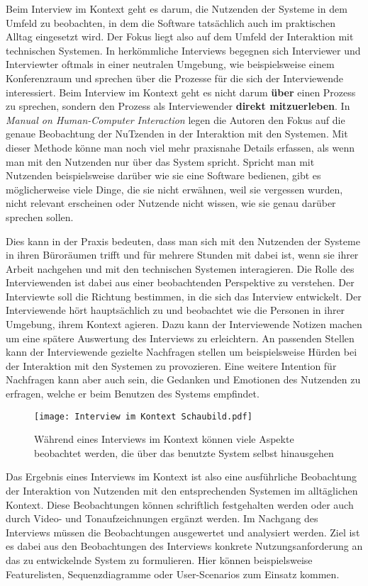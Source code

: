 Beim Interview im Kontext geht es darum, die Nutzenden der Systeme in dem
Umfeld zu beobachten, in dem die Software tatsächlich auch im praktischen
Alltag eingesetzt wird. Der Fokus liegt also auf dem Umfeld der Interaktion mit
technischen Systemen. In herkömmliche Interviews begegnen sich Interviewer und
Interviewter oftmals in einer neutralen Umgebung, wie beispielsweise einem
Konferenzraum und sprechen über die Prozesse für die sich der Interviewende
interessiert. Beim Interview im Kontext geht es nicht darum \textbf{über} einen
Prozess zu sprechen, sondern den Prozess als Interviewender \textbf{direkt
    mitzuerleben}\cite{contextualDesign}. In \textit{Manual on Human-Computer
    Interaction} legen die Autoren den Fokus auf die genaue Beobachtung der
NuTzenden in der Interaktion mit den Systemen. Mit dieser Methode könne man
noch viel mehr praxisnahe Details erfassen, als wenn man mit den Nutzenden nur
über das System spricht. Spricht man mit Nutzenden beispielsweise darüber wie
sie eine Software bedienen, gibt es möglicherweise viele Dinge, die sie nicht
erwähnen, weil sie vergessen wurden, nicht relevant erscheinen oder Nutzende
nicht wissen, wie sie genau darüber sprechen sollen\cite{hciHandbook}.

Dies kann in der Praxis bedeuten, dass man sich mit den Nutzenden der Systeme
in ihren Büroräumen trifft und für mehrere Stunden mit dabei ist, wenn sie
ihrer Arbeit nachgehen und mit den technischen Systemen interagieren. Die Rolle
des Interviewenden ist dabei aus einer beobachtenden Perspektive zu verstehen.
Der Interviewte soll die Richtung bestimmen, in die sich das Interview
entwickelt. Der Interviewende hört hauptsächlich zu und beobachtet wie die
Personen in ihrer Umgebung, ihrem Kontext agieren\cite{hciHandbook}. Dazu kann
der Interviewende Notizen machen um eine spätere Auswertung des Interviews zu
erleichtern. An passenden Stellen kann der Interviewende gezielte Nachfragen
stellen um beispielsweise Hürden bei der Interaktion mit den Systemen zu
provozieren. Eine weitere Intention für Nachfragen kann aber auch sein, die
Gedanken und Emotionen des Nutzenden zu erfragen, welche er beim Benutzen des
Systems empfindet.

\begin{figure}[h]
    \caption{Während eines Interviews im Kontext können viele Aspekte beobachtet werden, die über das benutzte System selbst hinausgehen\cite{johannesGrafik}}
    \centering
    \texttt{[image: Interview im Kontext Schaubild.pdf]}
\end{figure}

Das Ergebnis eines Interviews im Kontext ist also eine ausführliche Beobachtung
der Interaktion von Nutzenden mit den entsprechenden Systemen im alltäglichen
Kontext. Diese Beobachtungen können schriftlich festgehalten werden oder auch
durch Video- und Tonaufzeichnungen ergänzt werden. Im Nachgang des Interviews
müssen die Beobachtungen ausgewertet und analysiert werden. Ziel ist es dabei
aus den Beobachtungen des Interviews konkrete Nutzungsanforderung an das zu
entwickelnde System zu formulieren\cite{HMI-HCD}. Hier können beispielsweise Featurelisten,
Sequenzdiagramme oder User-Scenarios zum Einsatz kommen\cite{sequenceDiagrams}.